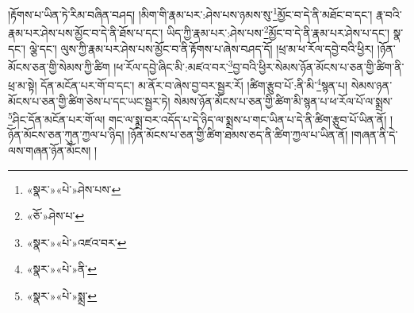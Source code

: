 །རྟོགས་པ་ཡིན་ཏེ་རིམ་བཞིན་བཤད། །མིག་གི་རྣམ་པར་:ཤེས་པས་ཉམས་སུ་\footnote{«སྣར་»«པེ་»ཤེས་པས་}མྱོང་བ་དེ་ནི་མཐོང་བ་དང་། རྣ་བའི་རྣམ་པར་ཤེས་པས་མྱོང་བ་དེ་ནི་ཐོས་པ་དང་། ཡིད་ཀྱི་རྣམ་པར་:ཤེས་པས་\footnote{«ཅོ་»ཤེས་པ་}མྱོང་བ་དེ་ནི་རྣམ་པར་ཤེས་པ་དང་། སྣ་དང་། ལྕེ་དང་། ལུས་ཀྱི་རྣམ་པར་ཤེས་པས་མྱོང་བ་ནི་རྟོགས་པ་ཞེས་བཤད་དོ། །ཕྲ་མ་ཕ་རོལ་དབྱེ་བའི་ཕྱིར། །ཉོན་མོངས་ཅན་གྱི་སེམས་ཀྱི་ཚིག །ཕ་རོལ་དབྱེ་ཞིང་མི་:མཛའ་བར་\footnote{«སྣར་»«པེ་»འཛའ་བར་}བྱ་བའི་ཕྱིར་སེམས་ཉོན་མོངས་པ་ཅན་གྱི་ཚིག་ནི་ཕྲ་མ་སྟེ། དོན་མངོན་པར་གོ་བ་དང་། མ་ནོར་བ་ཞེས་བྱ་བར་སྦྱར་རོ། །ཚིག་རྩུབ་པོ་:ནི་མི་\footnote{«སྣར་»«པེ་»ནི་}སྙན་པ། སེམས་ཉན་མོངས་པ་ཅན་གྱི་ཚིག་ཅེས་པ་དང་ཡང་སྦྱར་ཏེ། སེམས་ཉོན་མོངས་པ་ཅན་གྱི་ཚིག་མི་སྙན་པ་ཕ་རོལ་པོ་ལ་སྨྲས་\footnote{«སྣར་»«པེ་»སྨྲ་}ཤིང་དོན་མངོན་པར་གོ་ལ། གང་ལ་སྨྲ་བར་འདོད་པ་དེ་ཉིད་ལ་སྨྲས་པ་གང་ཡིན་པ་དེ་ནི་ཚིག་རྩུབ་པོ་ཡིན་ནོ། །ཉོན་མོངས་ཅན་ཀུན་ཀྱལ་པ་ཉིད། །ཉོན་མོངས་པ་ཅན་གྱི་ཚིག་ཐམས་ཅད་ནི་ཚིག་ཀྱལ་པ་ཡིན་ནོ། །གཞན་ནི་དེ་ལས་གཞན་ཉོན་མོངས། །
